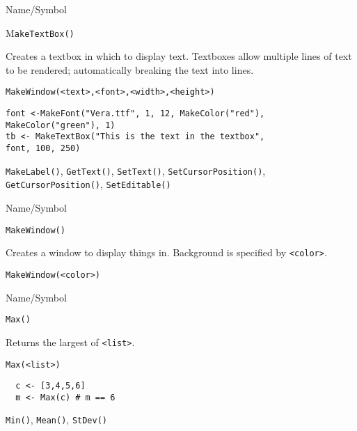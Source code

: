 \rl


\begin{desc}{Name/Symbol}
\item[Name/Symbol]	M\verb+akeTextBox()+

\item[Description]	Creates a textbox in which to display text. 
		Textboxes allow multiple lines of text to be rendered;
		automatically breaking the text into lines. 

\item[Usage]
\begin{verbatim}
MakeWindow(<text>,<font>,<width>,<height>)
\end{verbatim}

\item[Example]	
\begin{verbatim}
font <-MakeFont("Vera.ttf", 1, 12, MakeColor("red"), 
MakeColor("green"), 1)
tb <- MakeTextBox("This is the text in the textbox", 
font, 100, 250)
\end{verbatim}

\item[See Also]	\verb+MakeLabel()+, \verb+GetText()+, \verb+SetText()+, \verb+SetCursorPosition()+,
		\verb+GetCursorPosition()+, \verb+SetEditable()+
\end{desc}

\rl


\begin{desc}{Name/Symbol}
\item[Name/Symbol]	\verb+MakeWindow()+ 

\item[Description]	Creates a window to display things in.
		Background is specified by \verb+<color>+.

\item[Usage]		
\begin{verbatim}
MakeWindow(<color>)
\end{verbatim}

\item[Example]	

\item[See Also]	
\end{desc}

\rl


\begin{desc}{Name/Symbol}
\item[Name/Symbol]	\verb+Max()+            

\item[Description] Returns the largest of \verb+<list>+.

\item[Usage]		
\begin{verbatim}
Max(<list>)
\end{verbatim}

\item[Example]	
\begin{verbatim} 
  c <- [3,4,5,6]
  m <- Max(c) # m == 6
\end{verbatim}

\item[See Also]	\verb+Min()+, \verb+Mean()+, \verb+StDev()+
\end{desc}


